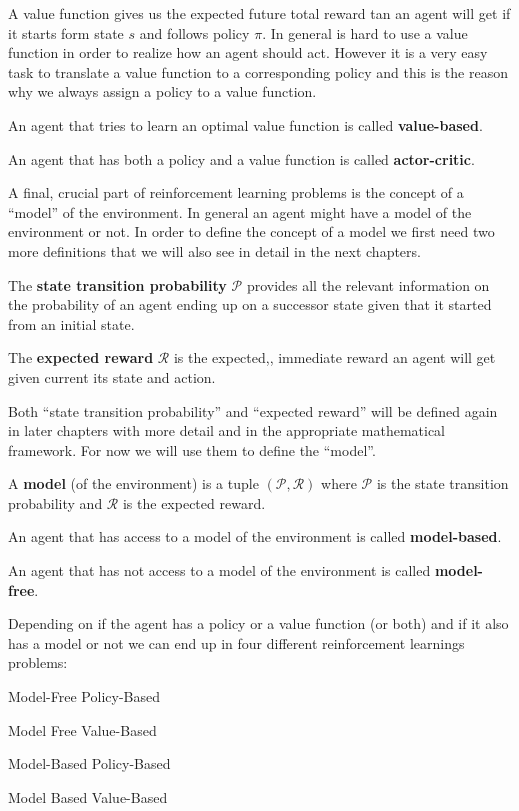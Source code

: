 A value function gives us the expected future total reward tan an agent will get if it starts form state $s$ and 
follows policy $\pi$. In general is hard to use a value function in order to realize how an agent should act. However
it is a very easy task to translate a value function to a corresponding policy and this is the reason why we always 
assign a policy to a value function.

An agent that tries to learn an optimal value function is called \textbf{value-based}.
\ed

An agent that has both a policy and a value function is called \textbf{actor-critic}.
\ed

A final, crucial part of reinforcement learning problems is the concept of a ``model'' of the environment. In general 
an agent might have a model of the environment or not. In order to define the concept of a model we first need two 
more definitions that we will also see in detail in the next chapters.

The \textbf{state transition probability} $\mathcal{P}$ provides all the relevant information on the probability of 
an agent ending up on a successor state given that it started from an initial state. 
\ed

The \textbf{expected reward} $\mathcal{R}$ is the expected,, immediate reward an agent will get given current its 
state and action. 
\ed

Both ``state transition probability'' and ``expected reward'' will be defined again in later chapters with more detail 
and in the appropriate mathematical framework. For now we will use them to define the ``model''.

\bd[Model]
A \textbf{model} (of the environment) is a tuple $(\mathcal{P},\mathcal{R})$ where $\mathcal{P}$ is the state 
transition probability and $\mathcal{R}$ is the expected reward. 
\ed

An agent that has access to a model of the environment is called \textbf{model-based}.
\ed

An agent that has not access to a model of the environment is called \textbf{model-free}.
\ed

Depending on if the agent has a policy or a value function (or both) and if it also has a model or not we can end up 
in four different reinforcement learnings problems:
\bit
\item Model-Free Policy-Based
\item Model Free Value-Based
\item Model-Based Policy-Based
\item Model Based Value-Based
\eit

